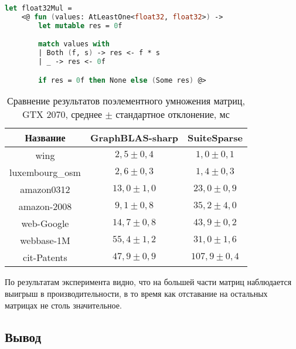 \documentclass[14pt]{matmex-diploma-custom}
\begin{document}
\begin{lstlisting}[caption={Операция поэлементного умножения в GraphBLAS-sharp},label={lst:ewisemul},language=FSharp, basicstyle=\small]
let float32Mul =
    <@ fun (values: AtLeastOne<float32, float32>) ->
        let mutable res = 0f

        match values with
        | Both (f, s) -> res <- f * s
        | _ -> res <- 0f

        if res = 0f then None else (Some res) @>
\end{lstlisting}

\begin{table}
\centering
\begin{tabular}{|c||c|c|}
\hline
Название            & GraphBLAS-sharp & SuiteSparse    \\
\hline
\hline
wing            & $2,5 \pm 0,4$      & $1,0 \pm 0,1$ \\
\hline
luxembourg\_osm & $2,6 \pm 0,3$       & $1,4 \pm 0,3$ \\
\hline
amazon0312      & $13,0 \pm 1,0$     & $23,0 \pm 0,9$ \\
\hline
amazon-2008     & $9,1 \pm 0,8$    & $35,2 \pm 4,0$ \\
\hline
web-Google      & $14,7 \pm 0,8$      & $43,9 \pm 0,2$  \\
\hline
webbase-1M      & $55,4 \pm 1,2$      & $31,0 \pm 1,6$ \\
\hline
cit-Patents     & $47,9 \pm 0,9$      & $107,9 \pm 0,4$  \\     
\hline
\end{tabular}
\caption{Сравнение результатов поэлементного умножения матриц, GTX 2070, среднее $\pm$ стандартное отклонение, мс}
\label{mult-comparison}
\end{table}

По результатам эксперимента видно, что на большей части матриц наблюдается выигрыш в производительности, в то время как отставание на остальных матрицах не столь значительное.

\subsection{Вывод}
\end{document}
